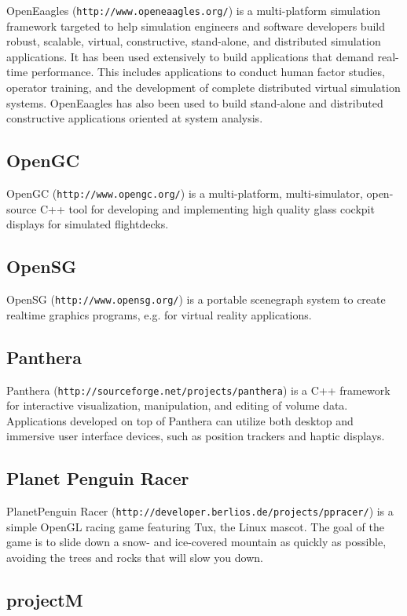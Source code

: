 OpenEaagles ({\tt http://www.openeaagles.org/}) is a multi-\/platform simulation framework targeted to help simulation engineers and software developers build robust, scalable, virtual, constructive, stand-\/alone, and distributed simulation applications. It has been used extensively to build applications that demand real-\/time performance. This includes applications to conduct human factor studies, operator training, and the development of complete distributed virtual simulation systems. OpenEaagles has also been used to build stand-\/alone and distributed constructive applications oriented at system analysis.\subsection{OpenGC}\label{ftgl-projects_opengc}
OpenGC ({\tt http://www.opengc.org/}) is a multi-\/platform, multi-\/simulator, open-\/source C++ tool for developing and implementing high quality glass cockpit displays for simulated flightdecks.\subsection{OpenSG}\label{ftgl-projects_opensg}
OpenSG ({\tt http://www.opensg.org/}) is a portable scenegraph system to create realtime graphics programs, e.g. for virtual reality applications.\subsection{Panthera}\label{ftgl-projects_panthera}
Panthera ({\tt http://sourceforge.net/projects/panthera}) is a C++ framework for interactive visualization, manipulation, and editing of volume data. Applications developed on top of Panthera can utilize both desktop and immersive user interface devices, such as position trackers and haptic displays.\subsection{Planet Penguin Racer}\label{ftgl-projects_ppracer}
PlanetPenguin Racer ({\tt http://developer.berlios.de/projects/ppracer/}) is a simple OpenGL racing game featuring Tux, the Linux mascot. The goal of the game is to slide down a snow-\/ and ice-\/covered mountain as quickly as possible, avoiding the trees and rocks that will slow you down.\subsection{projectM}\label{ftgl-projects_projectm}
